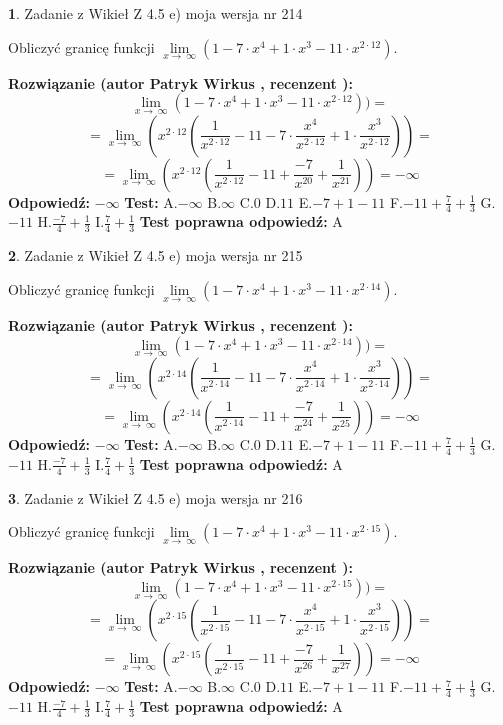 \documentclass[12pt, a4paper]{article}
\theoremstyle{definition} %
\newtheorem{zad}{}
\newcommand{\zadStart}[1]{\begin{zad}#1\newline}
\newcommand{\zadStop}{\end{zad}}
\newcommand{\rozwStart}[2]{\noindent \textbf{Rozwiązanie (autor #1 , recenzent #2): }\newline}
\newcommand{\rozwStop}{\newline}
\newcommand{\odpStart}{\noindent \textbf{Odpowiedź:}\newline}
\newcommand{\odpStop}{\newline}
\newcommand{\testStart}{\noindent \textbf{Test:}\newline}
\newcommand{\testStop}{\newline}
\newcommand{\kluczStart}{\noindent \textbf{Test poprawna odpowiedź:}\newline}
\newcommand{\kluczStop}{\newline}
\begin{document}
\zadStart{Zadanie z Wikieł Z 4.5 e) moja wersja nr 214}



Obliczyć granicę funkcji  $\lim\limits_{x\to\ \infty}(1 - 7 \cdot x^{4}+1 \cdot x^{3}- 11 \cdot x^{2\cdot12})$.
\zadStop
\rozwStart{Patryk Wirkus}{}
$$\lim\limits_{x\to\ \infty}(1 - 7 \cdot x^{4}+1 \cdot x^{3}- 11 \cdot x^{2\cdot12}))=$$
$$=\lim\limits_{x\to\ \infty}(x^{2\cdot12}(\frac{1}{x^{2\cdot12}}-11 -7 \cdot \frac{x^{4}}{x^{2\cdot12}}+1 \cdot \frac{x^{3}}{x^{2\cdot12}}))=$$
$$=\lim\limits_{x\to\ \infty}(x^{2\cdot12}(\frac{1}{x^{2\cdot12}}-11 + \frac{-7}{x^{20}}+ \frac{1}{x^{21}}))=-\infty$$
\rozwStop
\odpStart
$-\infty$
\odpStop
\testStart
A.$-\infty$ B.$\infty$ C.$0$ D.$11$ E.$-7 + 1 - 11$
F.$-11+\frac{7}{4}+\frac{1}{3}$ G.$-11$
H.$\frac{-7}{4}+\frac{1}{3}$
I.$\frac{7}{4}+\frac{1}{3}$
\testStop
\kluczStart
A
\kluczStop



\zadStart{Zadanie z Wikieł Z 4.5 e) moja wersja nr 215}



Obliczyć granicę funkcji  $\lim\limits_{x\to\ \infty}(1 - 7 \cdot x^{4}+1 \cdot x^{3}- 11 \cdot x^{2\cdot14})$.
\zadStop
\rozwStart{Patryk Wirkus}{}
$$\lim\limits_{x\to\ \infty}(1 - 7 \cdot x^{4}+1 \cdot x^{3}- 11 \cdot x^{2\cdot14}))=$$
$$=\lim\limits_{x\to\ \infty}(x^{2\cdot14}(\frac{1}{x^{2\cdot14}}-11 -7 \cdot \frac{x^{4}}{x^{2\cdot14}}+1 \cdot \frac{x^{3}}{x^{2\cdot14}}))=$$
$$=\lim\limits_{x\to\ \infty}(x^{2\cdot14}(\frac{1}{x^{2\cdot14}}-11 + \frac{-7}{x^{24}}+ \frac{1}{x^{25}}))=-\infty$$
\rozwStop
\odpStart
$-\infty$
\odpStop
\testStart
A.$-\infty$ B.$\infty$ C.$0$ D.$11$ E.$-7 + 1 - 11$
F.$-11+\frac{7}{4}+\frac{1}{3}$ G.$-11$
H.$\frac{-7}{4}+\frac{1}{3}$
I.$\frac{7}{4}+\frac{1}{3}$
\testStop
\kluczStart
A
\kluczStop



\zadStart{Zadanie z Wikieł Z 4.5 e) moja wersja nr 216}



Obliczyć granicę funkcji  $\lim\limits_{x\to\ \infty}(1 - 7 \cdot x^{4}+1 \cdot x^{3}- 11 \cdot x^{2\cdot15})$.
\zadStop
\rozwStart{Patryk Wirkus}{}
$$\lim\limits_{x\to\ \infty}(1 - 7 \cdot x^{4}+1 \cdot x^{3}- 11 \cdot x^{2\cdot15}))=$$
$$=\lim\limits_{x\to\ \infty}(x^{2\cdot15}(\frac{1}{x^{2\cdot15}}-11 -7 \cdot \frac{x^{4}}{x^{2\cdot15}}+1 \cdot \frac{x^{3}}{x^{2\cdot15}}))=$$
$$=\lim\limits_{x\to\ \infty}(x^{2\cdot15}(\frac{1}{x^{2\cdot15}}-11 + \frac{-7}{x^{26}}+ \frac{1}{x^{27}}))=-\infty$$
\rozwStop
\odpStart
$-\infty$
\odpStop
\testStart
A.$-\infty$ B.$\infty$ C.$0$ D.$11$ E.$-7 + 1 - 11$
F.$-11+\frac{7}{4}+\frac{1}{3}$ G.$-11$
H.$\frac{-7}{4}+\frac{1}{3}$
I.$\frac{7}{4}+\frac{1}{3}$
\testStop
\kluczStart
A
\kluczStop
\end{document}
